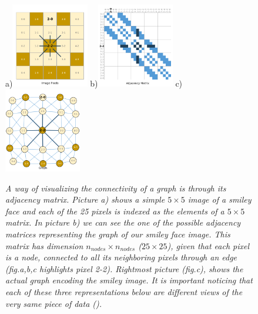 \documentclass[binding=0.6cm]{sapthesis}
\newcommand{\mycite}[1]{(\cite{#1})}
\begin{document}
\begin{figure}
    \centering
    \footnotesize a)\includegraphics[width=0.3\textwidth]{imgs/background/smile-graph-01.png}
    \footnotesize b)\includegraphics[width=0.3\textwidth]{imgs/background/smile-graph-02.png}
    \footnotesize c)\includegraphics[width=0.3\textwidth]{imgs/background/smile-graph-03.png}
    \caption{\textit{A way of visualizing the connectivity of a graph is through its adjacency matrix. Picture a) shows a simple $5\times5$ image of a smiley face and each of the 25 pixels is indexed as the elements of a $5\times5$ matrix. In picture b) we can see the one of the possible adjacency matrices representing the graph of our smiley face image. This matrix has dimension $n_{nodes}\times n_{nodes}$ ($25\times25$), given that each pixel is a node, connected to all its neighboring pixels through an edge (fig.a,b,c highlights pixel 2-2). Rightmost picture (fig.c), shows the actual graph encoding the smiley image. It is important noticing that each of these three representations below are different views of the very same piece of data \mycite{distilPub-sanchez-lengeling2021a}.}}
    \label{fig:bg.graph_smile}
\end{figure}
\end{document}

